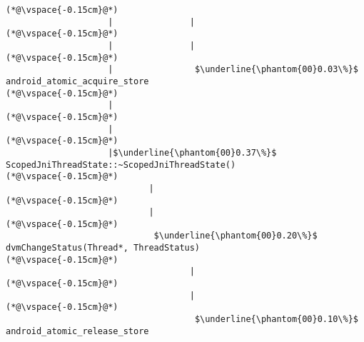 \begin{lstlisting}[caption=Metodikutsu C$\to$Java 20 viiteparametrilla, label=profile:C2JBenchmark00206, numberbychapter=true, frame=lines, float, floatplacement=t]
(*@\vspace{-0.15cm}@*)
                    |               |
(*@\vspace{-0.15cm}@*)
                    |               |
(*@\vspace{-0.15cm}@*)
                    |                $\underline{\phantom{00}0.03\%}$ android_atomic_acquire_store
(*@\vspace{-0.15cm}@*)
                    |
(*@\vspace{-0.15cm}@*)
                    |
(*@\vspace{-0.15cm}@*)
                    |$\underline{\phantom{00}0.37\%}$ ScopedJniThreadState::~ScopedJniThreadState()
(*@\vspace{-0.15cm}@*)
                            |
(*@\vspace{-0.15cm}@*)
                            |
(*@\vspace{-0.15cm}@*)
                             $\underline{\phantom{00}0.20\%}$ dvmChangeStatus(Thread*, ThreadStatus)
(*@\vspace{-0.15cm}@*)
                                    |
(*@\vspace{-0.15cm}@*)
                                    |
(*@\vspace{-0.15cm}@*)
                                     $\underline{\phantom{00}0.10\%}$ android_atomic_release_store

\end{lstlisting}

